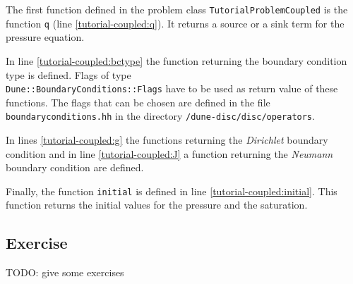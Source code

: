 The first function defined in the problem class \texttt{TutorialProblemCoupled} is the function \texttt{q} (line \ref{tutorial-coupled:q}). It returns a source or a sink term for the pressure equation.

In line \ref{tutorial-coupled:bctype} the function returning the boundary condition type is defined. 
Flags of type \\
\texttt{Dune::BoundaryConditions::Flags} have to be used as return value of these functions. 
The flags that can be chosen are defined in the file \texttt{boundaryconditions.hh} in the directory \texttt
{/dune-disc/disc/operators}.

In lines \ref{tutorial-coupled:g} the functions returning the \textit{Dirichlet} boundary condition and
in line \ref{tutorial-coupled:J} a function returning the \textit{Neumann} boundary condition are defined.

Finally, the function \texttt{initial} is defined in line \ref{tutorial-coupled:initial}. This function returns the initial values for the pressure and the
saturation.

\subsection{Exercise}
TODO: give some exercises

